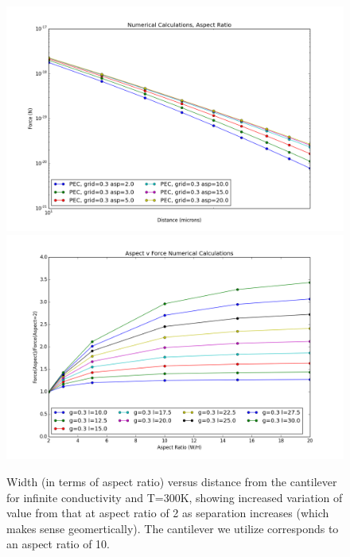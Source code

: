 \documentclass[11pt,traditabstract]{article}
\begin{document}
\begin{figure}[h]
\centering
\includegraphics[width=5in]{force_v_aspect}
\includegraphics[width=5in]{aspect_correction}
\caption{Width (in terms of aspect ratio) versus distance from the cantilever for infinite conductivity and T=300K, showing increased variation of value from that at aspect ratio of 2 as separation increases (which makes sense geomertically). The cantilever we utilize corresponds to an aspect ratio of 10.}\label{fig:aspect}
\end{figure}
\end{document}
